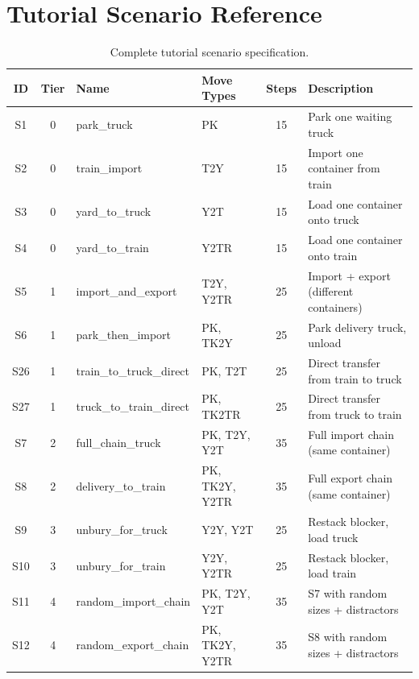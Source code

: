 \chapter{Tutorial Scenario Reference}
\label{app:scenarios}


\begin{table}[H]
\centering
\caption{Complete tutorial scenario specification.}
\label{tab:scenarios}
\small
\begin{tabularx}{\textwidth}{c c l l c X}
\toprule
\textbf{ID} & \textbf{Tier} & \textbf{Name} & \textbf{Move Types} & \textbf{Steps} & \textbf{Description} \\
\midrule
S1  & 0 & park\_truck             & PK        & 15 & Park one waiting truck \\
S2  & 0 & train\_import           & T2Y       & 15 & Import one container from train \\
S3  & 0 & yard\_to\_truck         & Y2T       & 15 & Load one container onto truck \\
S4  & 0 & yard\_to\_train         & Y2TR      & 15 & Load one container onto train \\
\midrule
S5  & 1 & import\_and\_export     & T2Y, Y2TR & 25 & Import + export (different containers) \\
S6  & 1 & park\_then\_import      & PK, TK2Y  & 25 & Park delivery truck, unload \\
S26 & 1 & train\_to\_truck\_direct & PK, T2T  & 25 & Direct transfer from train to truck \\
S27 & 1 & truck\_to\_train\_direct & PK, TK2TR & 25 & Direct transfer from truck to train \\
\midrule
S7  & 2 & full\_chain\_truck      & PK, T2Y, Y2T  & 35 & Full import chain (same container) \\
S8  & 2 & delivery\_to\_train     & PK, TK2Y, Y2TR & 35 & Full export chain (same container) \\
\midrule
S9  & 3 & unbury\_for\_truck      & Y2Y, Y2T  & 25 & Restack blocker, load truck \\
S10 & 3 & unbury\_for\_train      & Y2Y, Y2TR & 25 & Restack blocker, load train \\
\midrule
S11 & 4 & random\_import\_chain   & PK, T2Y, Y2T  & 35 & S7 with random sizes + distractors \\
S12 & 4 & random\_export\_chain   & PK, TK2Y, Y2TR & 35 & S8 with random sizes + distractors \\

\end{tabularx}
\end{table}
